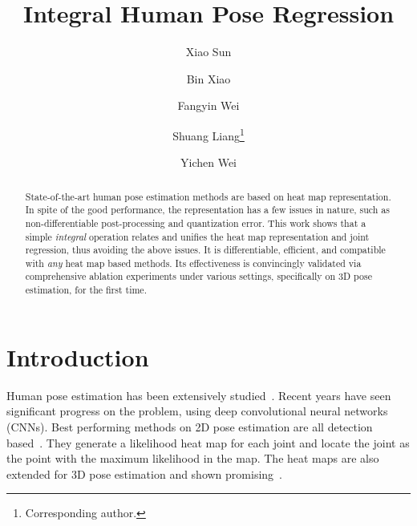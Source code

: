 \documentclass[runningheads]{llncs}
\begin{document}
\title{Integral Human Pose Regression} 




\author{Xiao Sun \and
Bin Xiao \and
Fangyin Wei \and 
Shuang Liang\thanks{Corresponding author.} \and
Yichen Wei}


\maketitle              \begin{abstract}
State-of-the-art human pose estimation methods are based on heat map representation. In spite of the good performance, the representation has a few issues in nature, such as non-differentiable post-processing and quantization error. This work shows that a simple \emph{integral} operation relates and unifies the heat map representation and joint regression, thus avoiding the above issues. It is differentiable, efficient, and compatible with \emph{any} heat map based methods. Its effectiveness is convincingly validated via comprehensive ablation experiments under various settings, specifically on 3D pose estimation, for the first time.
\end{abstract}


\section{Introduction}
\label{sec.introduction}

Human pose estimation has been extensively studied~\cite{ionescu2014human3,andriluka20142d,lin2014microsoft}. Recent years have seen significant progress on the problem, using deep convolutional neural networks (CNNs). Best performing methods on 2D pose estimation are all detection based~\cite{mpiiwebpage}. They generate a likelihood heat map for each joint and locate the joint as the point with the maximum likelihood in the map. The heat maps are also extended for 3D pose estimation and shown promising~\cite{pavlakos2016coarse}.
\end{document}
